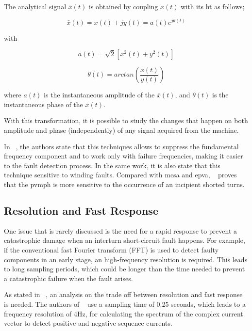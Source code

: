 The analytical signal $ \bar{x}(t) $ is obtained by coupling $x(t)$ with its \acrshort{ht} as follows;

\begin{equation} \label{eq:analytical_function}
    \bar{x}(t) = x(t) + jy(t) = a(t)e^{j\theta (t)}
\end{equation}

\noindent with

\begin{equation} \label{eq:analytical_function_a}
    a(t) = \sqrt{2}{ [ x^2(t) + y^2(t) ]}
\end{equation}

\begin{equation} \label{eq:analytical_function_o}
    \theta(t) = arctan\left (\frac{x(t)}{y(t)} \right)
\end{equation}

where $a(t)$ is the instantaneous amplitude of the $\bar{x}(t)$, and $\theta(t)$ is the instantaneous phase of the $\bar{x}(t)$.

With this transformation, it is possible to study the changes that happen on both amplitude and phase (independently) of any signal acquired from the machine.

In ~\cite{Kia2013}, the authors state that this techniques allows to suppress the fundamental frequency component and to work only with failure frequencies, making it easier to the fault detection process. In the same work, it is also state that this technique  sensitive to winding faults. Compared with \acrshort{mcsa} and \acrshort{epva}, ~\cite{Kia2013} proves that the \acrshort{pvmph} is more sensitive to the occurrence of an incipient shorted turns.

\subsection{Resolution and Fast Response} %
\label{subsec:resolution_fast_response}

One issue that is rarely discussed is the need for a rapid response to prevent a catastrophic damage when an interturn short-circuit fault happens. For example, if the conventional fast Fourier transform (FFT) is used to detect faulty components in an early stage, an high-frequency resolution is required. This leads to long sampling periods, which could be longer than the time needed to prevent a catastrophic failure when the fault arises. 

As stated in ~\cite{Cheng2011}, an analysis on the trade off between resolution and fast response is needed. The authors of ~\cite{Cheng2011} use a sampling time of 0.25 seconds, which leads to a frequency resolution of 4Hz, for calculating the spectrum of the complex current vector to detect positive and negative sequence currents.

